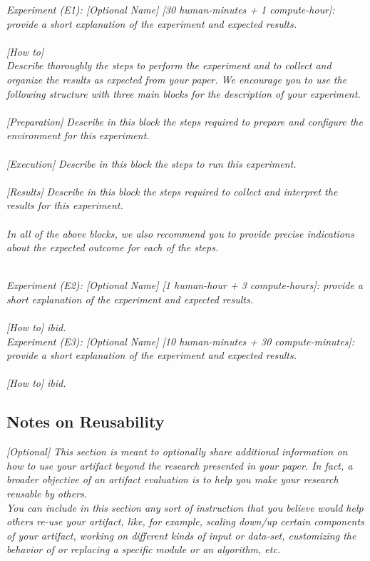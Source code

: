 \textit{Experiment (E1): [Optional Name] [30 human-minutes + 1 compute-hour]: provide a short explanation of the experiment and expected results.}\\\\
\textit{[How to]}\\
\textit{Describe thoroughly the steps to perform the experiment and to collect and organize the results as expected from your paper. We encourage you to use the following structure with three main blocks for the description of your experiment.} \\
~\\
\textit{[Preparation]}
\textit{Describe in this block the steps required to prepare and configure the environment for this experiment.}\\
~\\
\textit{[Execution]}
\textit{Describe in this block the steps to run this experiment.}\\
~\\
\textit{[Results]}
\textit{Describe in this block the steps required to collect and interpret the results for this experiment.}\\
~\\
\textit{In all of the above blocks, we also recommend you to provide precise indications about the expected outcome for each of the steps.}


~\\

\textit{Experiment (E2): [Optional Name] [1 human-hour + 3 compute-hours]: provide a short explanation of the experiment and expected results.}\\\\
\textit{[How to]} \textit{ibid.}
~\\

\textit{Experiment (E3): [Optional Name] [10 human-minutes + 30 compute-minutes]: provide a short explanation of the experiment and expected results.}\\\\
\textit{[How to]} \textit{ibid.}

\subsection{Notes on Reusability}
\label{sec:reuse}
{\em [Optional]}
\textit{This section is meant to optionally share additional information on how to use your artifact beyond the research presented in your paper. In fact, a broader objective of an artifact evaluation is to help you make your research reusable by others.\\
You can include in this section any sort of instruction that you believe would help others re-use your artifact, like, for example, scaling down/up certain components of your artifact, working on different kinds of input or data-set, customizing the behavior of or replacing a specific module or an algorithm, etc.}

